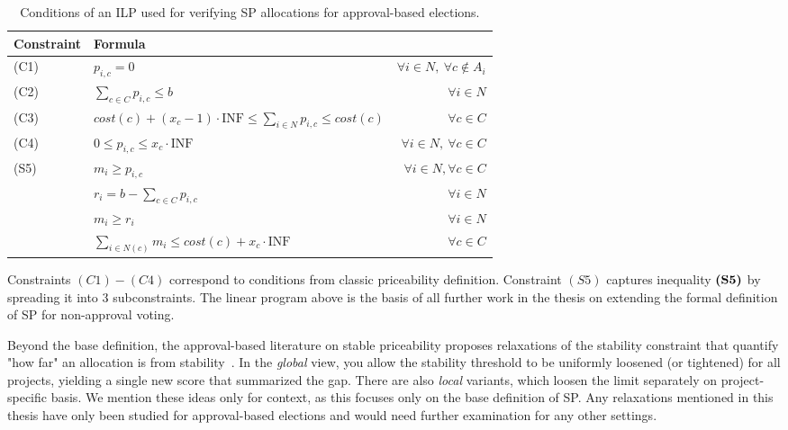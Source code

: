 \begin{table}[H]
\renewcommand{\arraystretch}{1.5}
\centering
\begin{tabular}{l|l r}
\hline
\textbf{Constraint} & \textbf{Formula} & \textbf{} \\
\hline
(C1) & $p_{i,c} = 0$ & $\forall i \in N,\ \forall c \notin A_i$ \\
(C2) & $\sum_{c \in C} p_{i,c} \leq b$ & $\forall i \in N$ \\
(C3) & $cost(c) + (x_c - 1)\cdot \text{INF} \leq \sum_{i \in N} p_{i,c} \leq cost(c)$ & $\forall c \in C$ \\
(C4) & $0 \leq p_{i,c} \leq x_c \cdot \text{INF}$ & $\forall i \in N,\ \forall c \in C$ \\
(S5) & $m_i\ge p_{i,c}$ & $\forall i \in N, \forall c \in C$ \\
 & $r_i=b-\sum_{c\in C}p_{i,c}$ & $\forall i \in N$ \\
 & $m_i\ge r_i$ & $\forall i \in N$\\
 & $\sum_{i\in N(c)}m_i \le cost(c) + x_c \cdot \text{INF}$ & $\forall c \in C$\\
\hline
\end{tabular}
\caption{Conditions of an ILP used for verifying SP allocations for approval-based elections.}
\end{table}
Constraints $(C1)-(C4)$ correspond to conditions from classic priceability definition. Constraint $(S5)$ captures inequality $\mbox{\textbf{(S5)}}$ by spreading it into $3$ subconstraints. The linear program above is the basis of all further work in the thesis on extending the formal definition of SP for non-approval voting.

Beyond the base definition, the approval-based literature on stable priceability proposes relaxations of the stability constraint that quantify "how far" an allocation is from stability~\cite{SPImplMasters}. In the \emph{global} view, you allow the stability threshold to be uniformly loosened (or tightened) for all projects, yielding a single new score that summarized the gap. There are also \emph{local} variants, which loosen the limit separately on project-specific basis. We mention these ideas only for context, as this focuses only on the base definition of SP. Any relaxations mentioned in this thesis have only been studied for approval-based elections and would need further examination for any other settings.